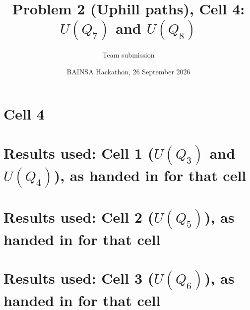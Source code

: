 
\title{Problem 2 (Uphill paths), Cell 4: $U(Q_7)$ and $U(Q_8)$}
\author{Team submission}
\date{BAINSA Hackathon, 26 September 2026}
\maketitle
\section{Cell 4}

\appendix
\section{Results used: Cell 1 ($U(Q_3)$ and $U(Q_4)$), as handed in for that cell}

\section{Results used: Cell 2 ($U(Q_5)$), as handed in for that cell}

\section{Results used: Cell 3 ($U(Q_6)$), as handed in for that cell}


